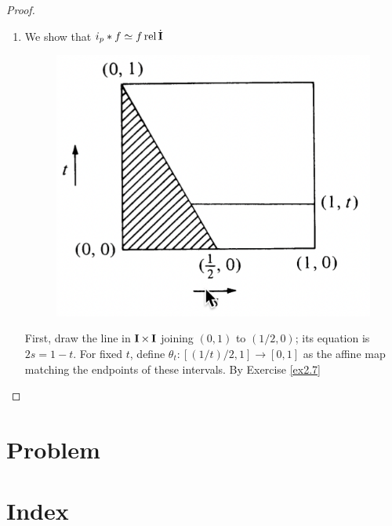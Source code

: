 \documentclass[11pt]{article}
\DeclareMathOperator{\rel}{\text{rel}}
\begin{document}
\begin{proof}
\begin{enumerate}
\item We show that \(i_p*f\simeq f\rel\dbI\)
\begin{figure}[htbp]
\centering
\includegraphics[width=.4\textwidth]{../images/AnIntroductionToAlgebraicTopology/8.png}
\label{}
\end{figure}
First, draw the line in \(\operatorname{\textbf{I}}\times\operatorname{\textbf{I}}\) joining \((0,1)\) to \((1/2,0)\); its equation is \(2s=1-t\).
For fixed \(t\), define \(\theta_t:[(1/t)/2,1]\to[0,1]\) as the affine map matching the endpoints of
these intervals. By Exercise \ref{ex2.7}
\end{enumerate}
\end{proof}







\section{Problem}
\label{sec:org8a81208}
\label{Problem1}

\label{Problem2}

\label{Problem3}

\section{Index}
\label{sec:org3df15cc}
\renewcommand{\indexname}{}
\printindex
\end{document}
